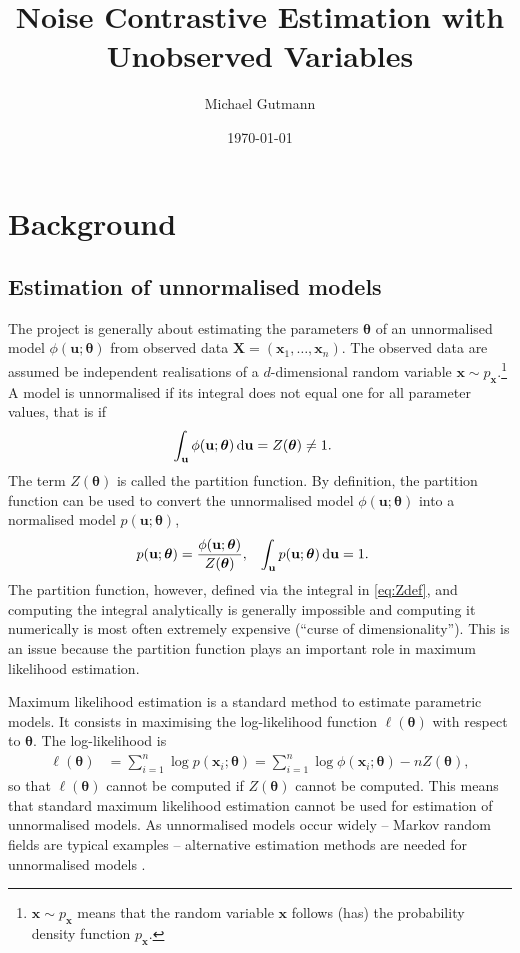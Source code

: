 \documentclass[11pt, oneside]{article}
\title{Noise Contrastive Estimation with Unobserved Variables}
\author{Michael Gutmann}
\date{\today}
\newcommand{\thetab}{{\boldsymbol{\theta}}}
\newcommand{\pnorm}{p}
\newcommand{\pnn}{\phi}
\newcommand{\pdata}{p_{ \mathbf x}}
\renewcommand{\u}{{\mathbf u}}
\newcommand{\x}{{\mathbf x}}
\newcommand{\X}{{\mathbf X}}
\begin{document}
\maketitle

\section{Background}
\subsection{Estimation of unnormalised models}
The project is generally about estimating the parameters $\thetab$ of
an unnormalised model $\pnn(\u ; \thetab)$ from observed data $\X =
(\x_1,\ldots,\x_n)$. The observed data are assumed be independent
realisations of a $d$-dimensional random variable $\x \sim \pdata$.\footnote{$\x \sim \pdata$ means that the
random variable $\x$ follows (has) the probability density function $\pdata$.} A
model is unnormalised if its integral does not equal one for all
parameter values, that is if
 \begin{align}
   \int_{\u }\pnn(\u;\thetab) \dif \u &= Z(\thetab) \neq 1.
\label{eq:Zdef}
  \end{align}
The term $Z(\thetab)$ is called the partition function. By definition,
the partition function can be used to convert the
unnormalised model $\pnn(\u;\thetab)$ into a normalised model
$\pnorm(\u;\thetab)$,
\begin{align}
  \pnorm(\u;\thetab)&=\frac{\pnn(\u;\thetab)}{Z(\thetab)}, & \int_{\u }\pnorm(\u;\thetab) \dif\u & = 1.
\end{align}
The partition function, however, defined via the integral in \eqref{eq:Zdef}, and computing the integral analytically is
generally impossible and computing it numerically is most often
extremely expensive (``curse of dimensionality''). This is an issue because the partition function
plays an important role in maximum likelihood estimation.

Maximum likelihood estimation is a standard method to estimate
parametric models. It consists in maximising the log-likelihood
function $\ell(\thetab)$ with respect to $\thetab$. The log-likelihood
is
\begin{align}
\ell(\thetab) &= \sum_{i=1}^n \log \pnorm(\x_i;\thetab) = \sum_{i=1}^n \log \pnn(\x_i;\thetab) - n Z(\thetab),
\end{align}
so that $\ell(\thetab)$ cannot be computed if $Z(\thetab)$ cannot be
computed. This means that standard maximum likelihood estimation
cannot be used for estimation of unnormalised models. As unnormalised
models occur widely -- Markov random fields are typical examples --
alternative estimation methods are needed for unnormalised models
\citep[see ][for further discussion]{Gutmann2013b}.
\end{document}
